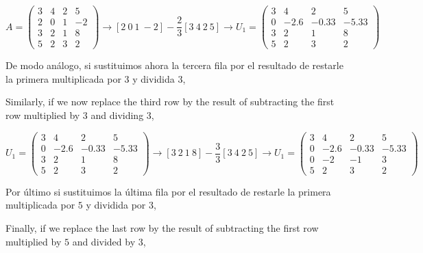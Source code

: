 \begin{equation*}
A=\begin{pmatrix}
3& 4& 2&5\\
2& 0& 1& -2\\
3& 2& 1& 8\\
5& 2& 3& 2
\end{pmatrix} \rightarrow [2\ 0\ 1\ -2]-\frac{2}{3} [3\ 4\ 2\ 5] \rightarrow U_1=\begin{pmatrix}
3& 4& 2&5\\
0& -2.6& -0.33& -5.33\\
3& 2& 1& 8\\
5& 2& 3& 2
\end{pmatrix}
\end{equation*}

\begin{paracol}{2}

De modo análogo, si sustituimos ahora la tercera fila por el resultado de restarle la primera multiplicada por $3$ y dividida $3$,

\switchcolumn

Similarly, if we now replace the third row by the result of subtracting the first row multiplied by $3$ and dividing $3$,
 
\end{paracol}

\begin{equation*}
U_1=\begin{pmatrix}
3& 4& 2&5\\
0& -2.6& -0.33& -5.33\\
3& 2& 1& 8\\
5& 2& 3& 2
\end{pmatrix} \rightarrow [3\ 2\ 1\ 8]-\frac{3}{3} [3\ 4\ 2\ 5] \rightarrow U_1=\begin{pmatrix}
3& 4& 2&5\\
0& -2.6& -0.33& -5.33\\
0& -2& -1& 3\\
5& 2& 3& 2
\end{pmatrix}
\end{equation*}

\begin{paracol}{2}

Por último si sustituimos la última fila por el resultado de restarle la primera multiplicada por $5$ y dividida por $3$,

\switchcolumn
Finally, if we replace the last row by the result of subtracting the first row multiplied by $5$ and divided by $3$,
\end{paracol}

